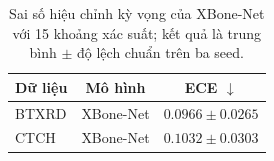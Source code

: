 \begin{table}[H]
\centering
\small
\begin{tabular}{|l|l|c|}
\hline
\multicolumn{1}{|c|}{\textbf{Dữ liệu}} & \multicolumn{1}{c|}{\textbf{Mô hình}} & \multicolumn{1}{c|}{\textbf{ECE $\downarrow$}} \\ \hline
BTXRD & \cellcolor{gray!12}XBone-Net & \cellcolor{gray!12}$0.0966\pm0.0265$ \\ \hline
CTCH & \cellcolor{gray!12}XBone-Net & \cellcolor{gray!12}$0.1032\pm0.0303$ \\ \hline
\end{tabular}
\caption{Sai số hiệu chỉnh kỳ vọng của XBone-Net với 15 khoảng xác suất; kết quả là trung bình $\pm$ độ lệch chuẩn trên ba seed.}
\label{tab:classification_ece}
\end{table}
